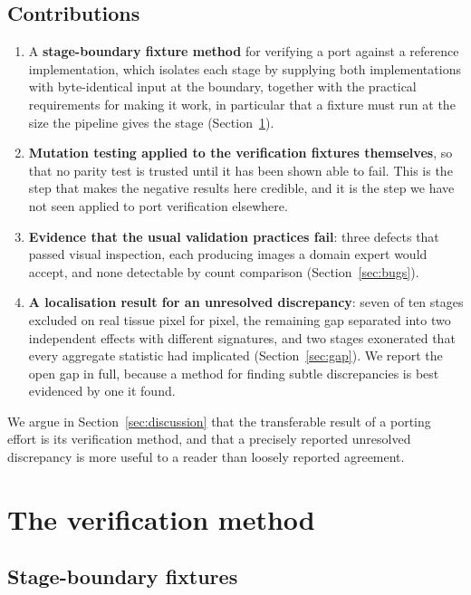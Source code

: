 \documentclass[11pt,a4paper]{article}
\begin{document}
\subsection*{Contributions}

\begin{enumerate}
  \item A \textbf{stage-boundary fixture method} for verifying a port against a
    reference implementation, which isolates each stage by supplying both
    implementations with byte-identical input at the boundary, together with
    the practical requirements for making it work, in particular that a fixture
    must run at the size the pipeline gives the stage
    (Section~\ref{sec:method}).
  \item \textbf{Mutation testing applied to the verification fixtures
    themselves}, so that no parity test is trusted until it has been shown able
    to fail. This is the step that makes the negative results here credible, and
    it is the step we have not seen applied to port verification elsewhere.
  \item \textbf{Evidence that the usual validation practices fail}: three
    defects that passed visual inspection, each producing images a domain
    expert would accept, and none detectable by count comparison
    (Section~\ref{sec:bugs}).
  \item \textbf{A localisation result for an unresolved discrepancy}: seven of
    ten stages excluded on real tissue pixel for pixel, the remaining gap
    separated into two independent effects with different signatures, and two
    stages exonerated that every aggregate statistic had implicated
    (Section~\ref{sec:gap}). We report the open gap in full, because a method
    for finding subtle discrepancies is best evidenced by one it found.
\end{enumerate}

We argue in Section~\ref{sec:discussion} that the transferable result of a
porting effort is its verification method, and that a precisely reported
unresolved discrepancy is more useful to a reader than loosely reported
agreement.

\section{The verification method}
\label{sec:method}

\subsection{Stage-boundary fixtures}
\end{document}
